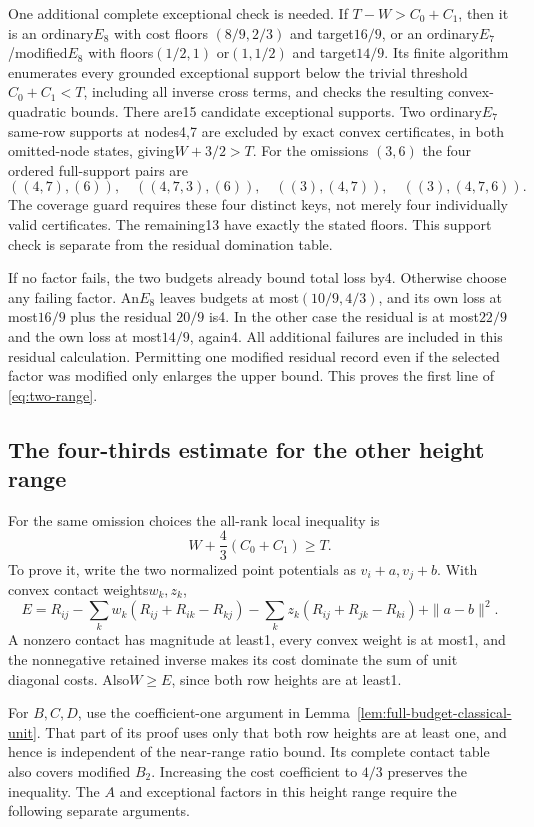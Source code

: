 \documentclass[11pt]{article}
\theoremstyle{remark}\newtheorem{remark}[theorem]{Remark}
\begin{document}
One additional complete exceptional check is needed. If
$T-W>C_0+C_1$, then it is an ordinary$E_8$ with cost floors
$(8/9,2/3)$ and target$16/9$, or an ordinary$E_7$/modified$E_8$
with floors$(1/2,1)$ or$(1,1/2)$ and target$14/9$.
Its finite algorithm enumerates every grounded exceptional support
below the trivial threshold$C_0+C_1<T$, including all inverse
cross terms, and checks the resulting convex-quadratic bounds.
There are15 candidate exceptional supports. Two ordinary$E_7$
same-row supports at nodes4,7 are excluded by exact convex
certificates, in both omitted-node states, giving$W+3/2>T$.
For the omissions $(3,6)$ the four ordered full-support pairs are
\[
 ((4,7),(6)),\quad ((4,7,3),(6)),\quad
 ((3),(4,7)),\quad ((3),(4,7,6)).
\]
The coverage guard requires these four distinct keys, not merely
four individually valid certificates. The remaining13 have
exactly the stated floors. This support
check is separate from the residual domination table.

If no factor fails, the two budgets already bound total loss by4.
Otherwise choose any failing factor. An$E_8$ leaves budgets at
most$(10/9,4/3)$, and its own loss at most$16/9$ plus the residual
$20/9$ is4. In the other case the residual is at most$22/9$ and
the own loss at most$14/9$, again4. All additional failures are
included in this residual calculation. Permitting one modified
residual record even if the selected factor was modified only
enlarges the upper bound. This proves the first line of
\eqref{eq:two-range}.

\subsection{The four-thirds estimate for the other height range}

For the same omission choices the all-rank local inequality is
\[
 W+\frac43(C_0+C_1)\ge T .
\]
To prove it, write the two normalized point potentials as
$v_i+a,v_j+b$. With convex contact weights$w_k,z_k$,
\[
 E=R_{ij}-\sum_kw_k(R_{ij}+R_{ik}-R_{kj})
             -\sum_kz_k(R_{ij}+R_{jk}-R_{ki})+\|a-b\|^2.
\]
A nonzero contact has magnitude at least1, every convex weight is at
most1, and the nonnegative retained inverse makes its cost dominate
the sum of unit diagonal costs. Also$W\ge E$, since both row
heights are at least1.

For $B,C,D$, use the coefficient-one argument in
Lemma~\ref{lem:full-budget-classical-unit}. That part of its proof uses
only that both row heights are at least one, and hence is independent
of the near-range ratio bound. Its complete contact table also covers
modified $B_2$. Increasing the cost coefficient to $4/3$ preserves the
inequality. The $A$ and exceptional factors in this height range
require the following separate arguments.
\end{document}
